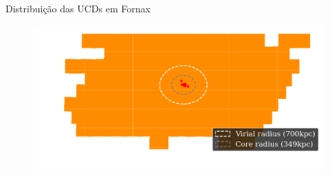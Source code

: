 \begin{frame}[c]{Distribuição das UCDs em Fornax}
    \begin{figure}
        \centering
        \includegraphics[width=0.8\linewidth, keepaspectratio]{images/zoom_fornax.png}
    \end{figure}
\end{frame}


